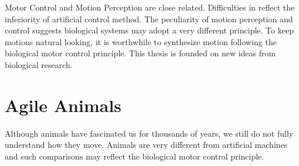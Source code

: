 Motor Control and Motion Perception are close related.
Difficulties in \cms reflect the inferiority of artificial control method.
The peculiarity of motion perception and control suggests  biological systems may adopt a very different principle.
To keep motions natural looking, it is worthwhile to synthesize motion following the biological motor control principle. 
This thesis is founded on new ideas from biological research.

 

\section{Agile Animals}
Although animals have fascinated us for thousands of years, we still do not fully understand how they move.
Animals are very different from artificial machines and such comparisons may reflect the  biological motor control principle.

